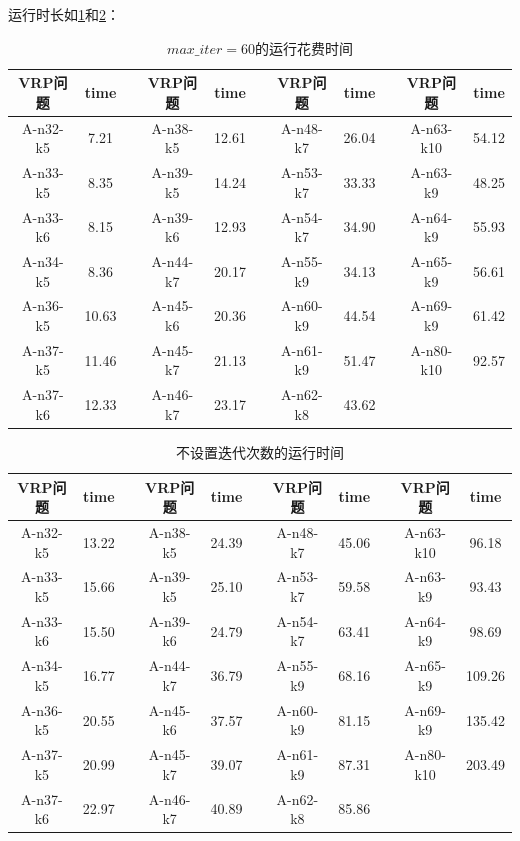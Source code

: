 \documentclass{nudt}
\begin{document}
运行时长如\cref{tab:timeimprove}和\cref{tab:timenoim}：
\begin{table}[H]
	\centering
	\caption{$max\_iter=60$的运行花费时间}
	  \begin{tabular}{ccccccccccc}
	  \toprule
	  \textbf{VRP问题} & \textbf{time} &     & \textbf{VRP问题} & \textbf{time} &     & \textbf{VRP问题} & \textbf{time} &     & \textbf{VRP问题} & \textbf{time} \\
	  \midrule
	  A-n32-k5 & 7.21 &     & A-n38-k5 & 12.61 &     & A-n48-k7 & 26.04 &     & A-n63-k10 & 54.12 \\
	  A-n33-k5 & 8.35 &     & A-n39-k5 & 14.24 &     & A-n53-k7 & 33.33 &     & A-n63-k9 & 48.25 \\
	  A-n33-k6 & 8.15 &     & A-n39-k6 & 12.93 &     & A-n54-k7 & 34.90 &     & A-n64-k9 & 55.93 \\
	  A-n34-k5 & 8.36 &     & A-n44-k7 & 20.17 &     & A-n55-k9 & 34.13 &     & A-n65-k9 & 56.61 \\
	  A-n36-k5 & 10.63 &     & A-n45-k6 & 20.36 &     & A-n60-k9 & 44.54 &     & A-n69-k9 & 61.42 \\
	  A-n37-k5 & 11.46 &     & A-n45-k7 & 21.13 &     & A-n61-k9 & 51.47 &     & A-n80-k10 & 92.57 \\
	  A-n37-k6 & 12.33 &     & A-n46-k7 & 23.17 &     & A-n62-k8 & 43.62 &     &     &  \\
	  \bottomrule
	  \end{tabular}%
	\label{tab:timeimprove}%
  \end{table}%
\begin{table}[H]
	\centering
	\caption{不设置迭代次数的运行时间}
	  \begin{tabular}{ccccccccccc}
	  \toprule
	  \textbf{VRP问题} & \textbf{time} &     & \textbf{VRP问题} & \textbf{time} &     & \textbf{VRP问题} & \textbf{time} &     & \textbf{VRP问题} & \textbf{time} \\
	  \midrule
	  A-n32-k5 & 13.22 &     & A-n38-k5 & 24.39 &     & A-n48-k7 & 45.06 &     & A-n63-k10 & 96.18 \\
	  A-n33-k5 & 15.66 &     & A-n39-k5 & 25.10 &     & A-n53-k7 & 59.58 &     & A-n63-k9 & 93.43 \\
	  A-n33-k6 & 15.50 &     & A-n39-k6 & 24.79 &     & A-n54-k7 & 63.41 &     & A-n64-k9 & 98.69 \\
	  A-n34-k5 & 16.77 &     & A-n44-k7 & 36.79 &     & A-n55-k9 & 68.16 &     & A-n65-k9 & 109.26 \\
	  A-n36-k5 & 20.55 &     & A-n45-k6 & 37.57 &     & A-n60-k9 & 81.15 &     & A-n69-k9 & 135.42 \\
	  A-n37-k5 & 20.99 &     & A-n45-k7 & 39.07 &     & A-n61-k9 & 87.31 &     & A-n80-k10 & 203.49 \\
	  A-n37-k6 & 22.97 &     & A-n46-k7 & 40.89 &     & A-n62-k8 & 85.86 &     &     &  \\
	  \bottomrule
	  \end{tabular}%
	\label{tab:timenoim}%
  \end{table}%
\end{document}
